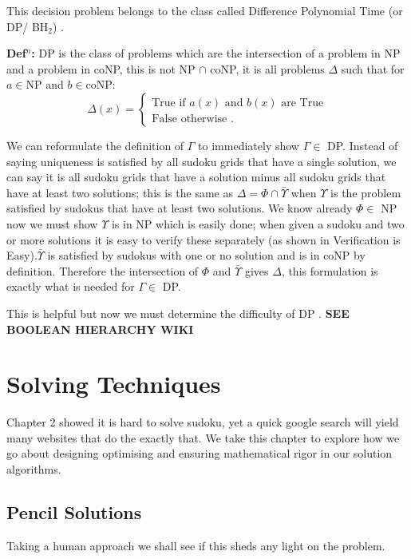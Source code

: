 \documentclass[a4paper,11pt]{report}
\begin{document}
This decision problem belongs to the class called Difference Polynomial Time (or DP/ BH$_2$) \cite{dpcomplexity}.

\textbf{Def$^n$:} DP is the class of problems which are the intersection of a problem in NP and a problem in coNP, this is not NP $\cap$ coNP, it is all problems $\Delta$ such that for $a \in $NP and $b\in $coNP:
		\begin{equation}
		        \Delta (x) = \begin{cases}
		            \text{True if $a(x)$ and $b(x)$ are True} \\
		            \text{False otherwise }.
				\end{cases}
		\end{equation}

We can reformulate the definition of $\Gamma$ to immediately show $\Gamma\in$ DP. Instead of saying uniqueness is satisfied by all sudoku grids that have a single solution, we can say it is all sudoku grids that have a solution minus all sudoku grids that have at least two solutions; this is the same as $\Delta = \Phi \cap \bar{\Upsilon}$ when $\Upsilon$ is the problem satisfied by sudokus that have at least two solutions. We know already $\Phi\in$ NP now we must show $\Upsilon$ is in NP which is easily done; when given a sudoku and two or more solutions it is easy to verify these separately (as shown in Verification is Easy).$\bar{\Upsilon}$ is satisfied by sudokus with one or no solution and is in coNP by definition. Therefore the intersection of $\Phi$ and $\bar{\Upsilon}$ gives $\Delta$, this formulation is exactly what is needed for $\Gamma\in$ DP.

This is helpful but now we must determine the difficulty of DP \cite{dphardness}. \textbf{SEE BOOLEAN HIERARCHY WIKI}
		

\chapter{Solving Techniques}
Chapter 2 showed it is hard to solve sudoku, yet a quick google search will yield many websites that do the exactly that. We take this chapter to explore how we go about designing optimising and ensuring mathematical rigor in our solution algorithms.
\section{Pencil Solutions}
Taking a human approach we shall see if this sheds any light on the problem.
\end{document}
